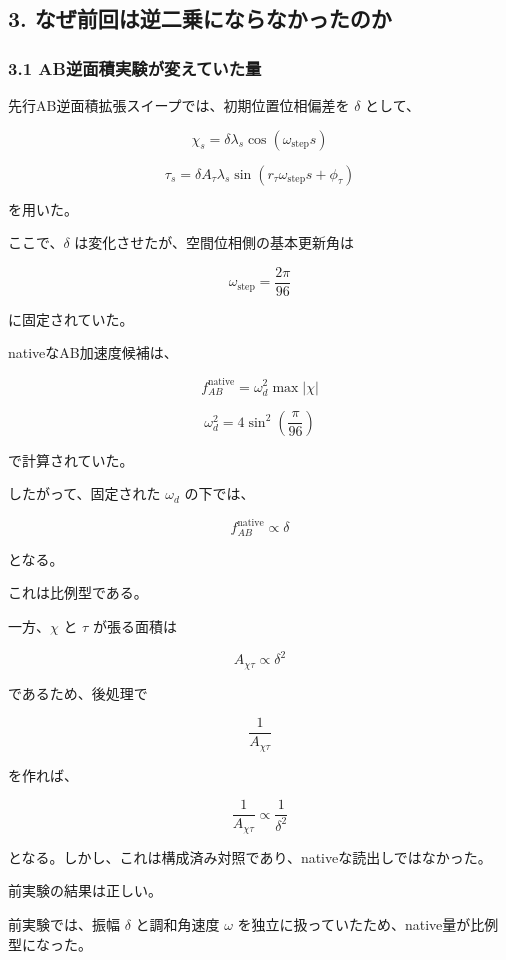 \documentclass[
  10pt,
  a4paper,
]{ltjsarticle}
\begin{document}
\subsection{3.
なぜ前回は逆二乗にならなかったのか}\label{ux306aux305cux524dux56deux306fux9006ux4e8cux4e57ux306bux306aux3089ux306aux304bux3063ux305fux306eux304b}

\subsubsection{3.1
AB逆面積実験が変えていた量}\label{abux9006ux9762ux7a4dux5b9fux9a13ux304cux5909ux3048ux3066ux3044ux305fux91cf}

先行AB逆面積拡張スイープでは、初期位置位相偏差を \(\delta\) として、

\[
\chi_s
=\delta\lambda_s\cos(\omega_{\mathrm{step}}s)
\]

\[
\tau_s
=\delta A_\tau\lambda_s
\sin(r_\tau\omega_{\mathrm{step}}s+\phi_\tau)
\]

を用いた。

ここで、\(\delta\) は変化させたが、空間位相側の基本更新角は

\[
\omega_{\mathrm{step}}
=\frac{2\pi}{96}
\]

に固定されていた。

nativeなAB加速度候補は、

\[
f_{AB}^{\mathrm{native}}
=\omega_d^2\max|\chi|
\]

\[
\omega_d^2
=4\sin^2\left(\frac{\pi}{96}\right)
\]

で計算されていた。

したがって、固定された \(\omega_d\) の下では、

\[
f_{AB}^{\mathrm{native}}\propto\delta
\]

となる。

これは比例型である。

一方、\(\chi\) と \(\tau\) が張る面積は

\[
A_{\chi\tau}\propto\delta^2
\]

であるため、後処理で

\[
\frac{1}{A_{\chi\tau}}
\]

を作れば、

\[
\frac{1}{A_{\chi\tau}}
\propto\frac{1}{\delta^2}
\]

となる。しかし、これは構成済み対照であり、nativeな読出しではなかった。

前実験の結果は正しい。

前実験では、振幅 \(\delta\) と調和角速度 \(\omega\)
を独立に扱っていたため、native量が比例型になった。
\end{document}
